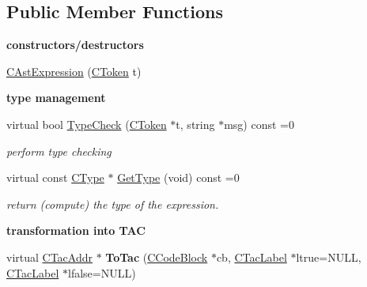 \subsection*{Public Member Functions}
\begin{Indent}{\bf constructors/destructors}\par
\begin{DoxyCompactItemize}
\item 
\hyperlink{classCAstExpression_a64a7fea5d837b23806ff591885667826}{C\-Ast\-Expression} (\hyperlink{classCToken}{C\-Token} t)
\end{DoxyCompactItemize}
\end{Indent}
\begin{Indent}{\bf type management}\par
\begin{DoxyCompactItemize}
\item 
virtual bool \hyperlink{classCAstExpression_a301baee7d5f700085371b706db8a3a56}{Type\-Check} (\hyperlink{classCToken}{C\-Token} $\ast$t, string $\ast$msg) const =0
\begin{DoxyCompactList}\small\item\em perform type checking \end{DoxyCompactList}\item 
\hypertarget{classCAstExpression_a820463ab829d31098f8f52c85aefec21}{virtual const \hyperlink{classCType}{C\-Type} $\ast$ \hyperlink{classCAstExpression_a820463ab829d31098f8f52c85aefec21}{Get\-Type} (void) const =0}\label{classCAstExpression_a820463ab829d31098f8f52c85aefec21}

\begin{DoxyCompactList}\small\item\em return (compute) the type of the expression. \end{DoxyCompactList}\end{DoxyCompactItemize}
\end{Indent}
\begin{Indent}{\bf transformation into T\-A\-C}\par
\begin{DoxyCompactItemize}
\item 
\hypertarget{classCAstExpression_ab00c14e5ead27859162da379e755be49}{virtual \hyperlink{classCTacAddr}{C\-Tac\-Addr} $\ast$ {\bfseries To\-Tac} (\hyperlink{classCCodeBlock}{C\-Code\-Block} $\ast$cb, \hyperlink{classCTacLabel}{C\-Tac\-Label} $\ast$ltrue=N\-U\-L\-L, \hyperlink{classCTacLabel}{C\-Tac\-Label} $\ast$lfalse=N\-U\-L\-L)}\label{classCAstExpression_ab00c14e5ead27859162da379e755be49}

\end{DoxyCompactItemize}
\end{Indent}
